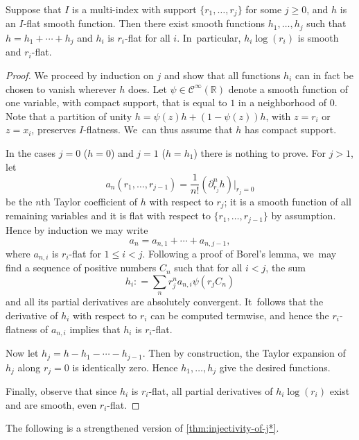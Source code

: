 \documentclass[JEP,XML,SOM,Unicode,NoFloatCountersInSection,published]{cedram}
\theoremstyle{definition}
\theoremstyle{remark}
\newcommand{\RR}{\mathbb{R}}
\renewcommand{\le}{\leqslant}
\renewcommand{\ge}{\geqslant}
\newcommand{\defas}{\mathrel{\mathop:}=}
\newcommand{\Cinf}[1]{\mathscr{C}^{\infty}_{#1}}
\newcommand{\cvf}[1]{\partial_{#1}}
\begin{document}
\begin{lemma}
Suppose that $I$ is a multi-index with support $\{r_1,\ldots,r_j\}$ for some $j \ge 0$, and $h$ is an $I$\nobreakdash-flat smooth function. Then there exist smooth functions $h_1,\ldots,h_j$ such that $h=h_1+\cdots + h_j$ and $h_i$ is $r_i$-flat for all $i$. In~particular, $h_i \log(r_i)$ is smooth and $r_i$-flat.
\end{lemma}

\begin{proof}
We proceed by induction on $j$ and show that all functions $h_i$ can in fact be chosen to vanish wherever $h$ does. Let $\psi\in\Cinf{}(\RR)$ denote a smooth function of one variable, with compact support, that is equal to $1$ in a neighborhood of $0$. Note that a partition of unity $h=\psi(z) h+(1-\psi(z)) h$, with $z=r_i$ or $z=x_i$, preserves $I$\nobreakdash-flatness. We~can thus assume that $h$ has compact support.

In the cases $j=0$ ($h=0$) and $j=1$ ($h=h_1$) there is nothing to prove. For $j>1$, let
\begin{equation*}
a_n(r_1,\ldots,r_{j-1}) = \frac{1}{n!}(\cvf{r_j}^n h) \big|_{r_j=0}
\end{equation*}
be the $n$th Taylor coefficient of $h$ with respect to $r_j$; it is a smooth function of all remaining variables and it is flat with respect to $\{r_1,\ldots,r_{j-1}\}$ by assumption. Hence by induction we may write
\[
a_n = a_{n,1} + \cdots + a_{n,j-1},
\]
where $a_{n,i}$ is $r_i$-flat for $1 \le i < j$. Following a proof of Borel's lemma, we~may find a sequence of positive numbers $C_n$ such that for all $i<j$, the sum
\begin{equation*}
h_i \defas \sum_{n} r_j^n a_{n,i} \psi(r_jC_n)
\end{equation*}
and all its partial derivatives are absolutely convergent. It~follows that the derivative of $h_i$ with respect to $r_i$ can be computed termwise, and hence the $r_i$-flatness of $a_{n,i}$ implies that $h_i$ is $r_i$-flat.

Now let $h_j = h - h_1 - \cdots - h_{j-1}$. Then by construction, the Taylor expansion of~$h_j$ along $r_j=0$ is identically zero. Hence $h_1,\ldots,h_j$ give the desired functions.

Finally, observe that since $h_i$ is $r_i$-flat, all partial derivatives of $h_i \log(r_i)$ exist and are smooth, even $r_i$-flat.
\end{proof}

The following is a strengthened version of \autoref{thm:injectivity-of-j*}.
\end{document}
